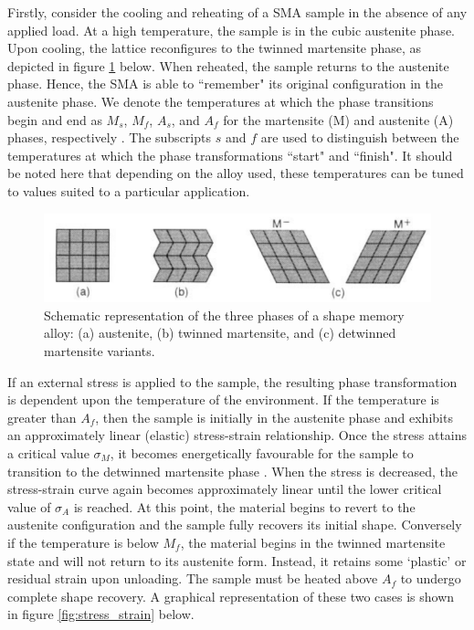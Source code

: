 \begin{multicols}{2}
Firstly, consider the cooling and reheating of a SMA sample in the absence of any applied load. At a high temperature, the sample is in the cubic austenite phase. Upon cooling, the lattice reconfigures to the twinned martensite phase, as depicted in figure \ref{fig:phases} below. When reheated, the sample returns to the austenite phase. Hence, the SMA is able to ``remember" its original configuration in the austenite phase. We denote the temperatures at which the phase transitions begin and end as $M_s$, $M_f$, $A_s$, and $A_f$ for the martensite (M) and austenite (A) phases, respectively \cite{smith2005smart}. The subscripts $s$ and $f$ are used to distinguish between the temperatures at which the phase transformations ``start" and ``finish".  It should be noted here that depending on the alloy used, these temperatures can be tuned to values suited to a particular application.

\begin{figure}[H]
    \centering
    \includegraphics[scale=0.39]{._figures/SMA phases.png}
    \caption[Schematic representation of the solid SMA phases]{Schematic representation of the three phases of a shape memory alloy: (a) austenite, (b) twinned martensite, and (c) detwinned martensite variants.}
    \label{fig:phases}
\end{figure}

If an external stress is applied to the sample, the resulting phase transformation is dependent upon the temperature of the environment. If the temperature is greater than $A_f$, then the sample is initially in the austenite phase and exhibits an approximately linear (elastic) stress-strain relationship. Once the stress attains a critical value $\sigma_M$, it becomes energetically favourable for the sample to transition to the detwinned martensite phase \cite{smith2005smart}. When the stress is decreased, the stress-strain curve again becomes approximately linear until the lower critical value of $\sigma_A$ is reached. At this point, the material begins to revert to the austenite configuration and the sample fully recovers its initial shape. Conversely if the temperature is below $M_f$, the material begins in the twinned martensite state and will not return to its austenite form. Instead, it retains some `plastic' or residual strain upon unloading. The sample must be heated above $A_f$ to undergo complete shape recovery. A graphical representation of these two cases is shown in figure \ref{fig:stress_strain} below.


\end{multicols}
